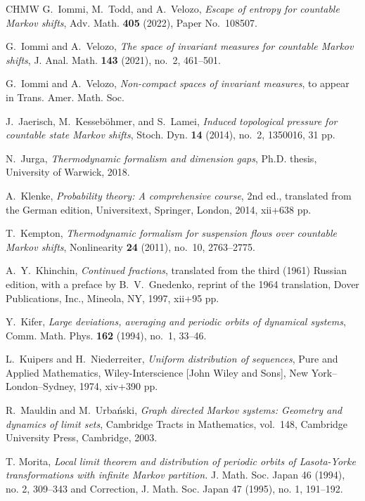 \documentclass[letterpaper,11pt]{amsart}
\numberwithin{equation}{section}     %
\begin{document}
\begin{thebibliography}{CHMW}
G.~Iommi, M.~Todd, and A.~Velozo,
\emph{Escape of entropy for countable Markov shifts},
Adv. Math. \textbf{405} (2022), Paper No.~108507.

G.~Iommi and A.~Velozo,
\emph{The space of invariant measures for countable Markov shifts},
J. Anal. Math. \textbf{143} (2021), no.~2, 461--501.

G.~Iommi and A.~Velozo,
\emph{Non-compact spaces of invariant measures},
to appear in Trans. Amer. Math. Soc.

J.~Jaerisch, M.~Kesseb\"ohmer, and S.~Lamei,
\emph{Induced topological pressure for countable state Markov shifts},
Stoch. Dyn. \textbf{14} (2014), no.~2, 1350016, 31 pp.

N.~Jurga,
\emph{Thermodynamic formalism and dimension gaps},
Ph.D. thesis, University of Warwick, 2018.

A.~Klenke,
\emph{Probability theory: A comprehensive course},
2nd ed., translated from the German edition, Universitext, Springer, London, 2014, xii+638 pp.

T.~Kempton,
\emph{Thermodynamic formalism for suspension flows over countable Markov shifts},
Nonlinearity \textbf{24} (2011), no.~10, 2763--2775.

A.~Y.~Khinchin,
\emph{Continued fractions},
translated from the third (1961) Russian edition, with a preface by B.~V.~Gnedenko,
reprint of the 1964 translation, Dover Publications, Inc., Mineola, NY, 1997, xii+95 pp.

Y.~Kifer,
\emph{Large deviations, averaging and periodic orbits of dynamical systems},
Comm. Math. Phys. \textbf{162} (1994), no.~1, 33--46.

L.~Kuipers and H.~Niederreiter,
\emph{Uniform distribution of sequences},
Pure and Applied Mathematics, Wiley-Interscience [John Wiley and Sons], New York--London--Sydney, 1974, xiv+390 pp.

R.~Mauldin and M.~Urba\'nski,
\emph{Graph directed Markov systems: Geometry and dynamics of limit sets},
Cambridge Tracts in Mathematics, vol.~148, Cambridge University Press, Cambridge, 2003.

 T. Morita, \emph{Local limit theorem and distribution of periodic orbits of Lasota-Yorke transformations with infinite Markov partition.} J. Math. Soc. Japan 46 (1994), no. 2, 309--343 and Correction, J. Math. Soc. Japan 47 (1995), no. 1, 191–192.


\end{thebibliography}
\end{document}
